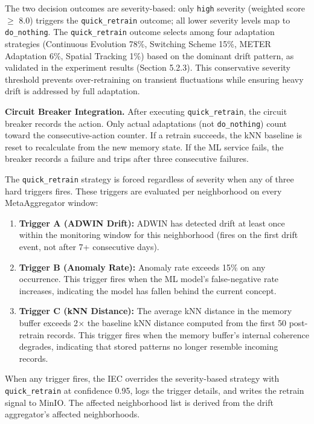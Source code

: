 The two decision outcomes are severity-based: only \texttt{high} severity (weighted score $\geq$ 8.0) triggers the \texttt{quick\_retrain} outcome; all lower severity levels map to \texttt{do\_nothing}. The \texttt{quick\_retrain} outcome selects among four adaptation strategies (Continuous Evolution 78\%, Switching Scheme 15\%, METER Adaptation 6\%, Spatial Tracking 1\%) based on the dominant drift pattern, as validated in the experiment results (Section 5.2.3). This conservative severity threshold prevents over-retraining on transient fluctuations while ensuring heavy drift is addressed by full adaptation.

\textbf{Circuit Breaker Integration.} After executing \texttt{quick\_retrain}, the circuit breaker records the action. Only actual adaptations (not \texttt{do\_nothing}) count toward the consecutive-action counter. If a retrain succeeds, the kNN baseline is reset to recalculate from the new memory state. If the ML service fails, the breaker records a failure and trips after three consecutive failures.


The \texttt{quick\_retrain} strategy is forced regardless of severity when any of three hard triggers fires. These triggers are evaluated per neighborhood on every MetaAggregator window:

\begin{enumerate}
    \item \textbf{Trigger A (ADWIN Drift):} ADWIN has detected drift at least once within the monitoring window for this neighborhood (fires on the first drift event, not after 7+ consecutive days).
    \item \textbf{Trigger B (Anomaly Rate):} Anomaly rate exceeds 15\% on any occurrence. This trigger fires when the ML model's false-negative rate increases, indicating the model has fallen behind the current concept.
    \item \textbf{Trigger C (kNN Distance):} The average kNN distance in the memory buffer exceeds 2$\times$ the baseline kNN distance computed from the first 50 post-retrain records. This trigger fires when the memory buffer's internal coherence degrades, indicating that stored patterns no longer resemble incoming records.
\end{enumerate}

When any trigger fires, the IEC overrides the severity-based strategy with \texttt{quick\_retrain} at confidence 0.95, logs the trigger details, and writes the retrain signal to MinIO. The affected neighborhood list is derived from the drift aggregator's affected neighborhoods.

